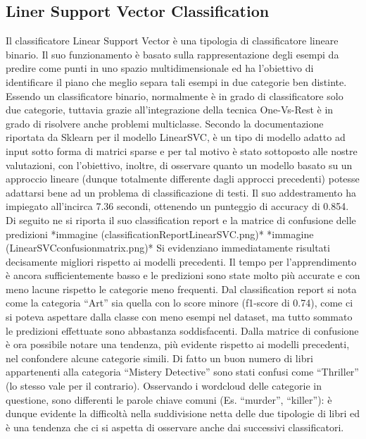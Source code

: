 \documentclass[12pt,oneside]{article}
\begin{document}
    \begin{enumerate}
    \subsection{Liner Support Vector Classification}
    \begin{justify}
        Il classificatore Linear Support Vector è una tipologia di classificatore lineare binario. Il suo funzionamento è basato sulla rappresentazione degli esempi da predire come punti in uno spazio multidimensionale ed ha l’obiettivo di identificare il piano che meglio separa tali esempi in due categorie ben distinte. Essendo un classificatore binario, normalmente è in grado di classificatore solo due categorie, tuttavia grazie all’integrazione della tecnica One-Vs-Rest è in grado di risolvere anche problemi multiclasse. 
        Secondo la documentazione riportata da Sklearn per il modello LinearSVC, è un tipo di modello adatto ad input sotto forma di matrici sparse e per tal motivo è stato sottoposto alle nostre valutazioni, con l’obiettivo, inoltre, di osservare quanto un modello basato su un approccio lineare (dunque totalmente differente dagli approcci precedenti) potesse adattarsi bene ad un problema di classificazione di testi.
        Il suo addestramento ha impiegato all’incirca 7.36 secondi, ottenendo un punteggio di accuracy di 0.854. Di seguito ne si riporta il suo classification report e la matrice di confusione delle predizioni
        *immagine (classificationReportLinearSVC.png)*
        *immagine (LinearSVCconfusionmatrix.png)*
        Si evidenziano immediatamente risultati decisamente migliori rispetto ai modelli precedenti. Il tempo per l’apprendimento è ancora sufficientemente basso e le predizioni sono state molto più accurate e con meno lacune rispetto le categorie meno frequenti. Dal classification report si nota come la categoria “Art” sia quella con lo score minore (f1-score di 0.74), come ci si poteva aspettare dalla classe con meno esempi nel dataset, ma tutto sommato le predizioni effettuate sono abbastanza soddisfacenti. Dalla matrice di confusione è ora possibile notare una tendenza, più evidente rispetto ai modelli precedenti, nel confondere alcune categorie simili. Di fatto un buon numero di libri appartenenti alla categoria “Mistery Detective” sono stati confusi come “Thriller” (lo stesso vale per il contrario). Osservando i wordcloud delle categorie in questione, sono differenti le parole chiave comuni (Es. “murder”, “killer”): è dunque evidente la difficoltà nella suddivisione netta delle due tipologie di libri ed è una tendenza che ci si aspetta di osservare anche dai successivi classificatori.
    \end{justify}
    \end{enumerate}
\end{document}
